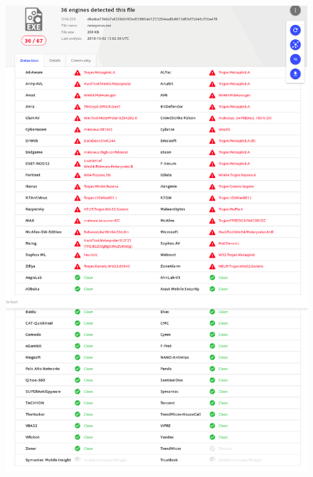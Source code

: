 \begin{figure}[!ht]
   \centering
   \includegraphics[scale=0.3]{images/screent_vt1.png}
   \caption{}
   \centering
\end{figure}

